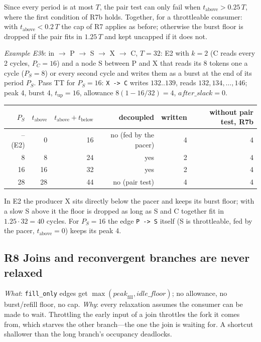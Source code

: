 \documentclass[10pt,a4paper]{article}
\newcommand{\code}[1]{\texttt{#1}}
\newcommand{\Tg}{T}           %
\begin{document}
Since every period is at most $\Tg$, the pair test can only fail when
$t_{\mathrm{above}}>0.25\,\Tg$, where the first condition of R7b holds. Together, for
a throttleable consumer: with $t_{\mathrm{above}}<0.2\,\Tg$ the cap of R7 applies as
before; otherwise the burst floor is dropped if the pair fits in $1.25\,\Tg$ and kept
uncapped if it does not.

\emph{Example E3b}: in $\to$ P $\to$ S $\to$ X $\to$ C, $\Tg=32$: E2 with $k=2$
(C reads every 2 cycles, $P_C=16$) and a node S between P and X that reads its 8 tokens
one a cycle ($P_S=8$) or every second cycle and writes them as a burst at the end of its
period $P_S$.
Pass TT for $P_S=16$: \code{X -> C} writes $132..139$, reads $132,134,\dots,146$; peak 4,
burst 4, $t_{\mathrm{up}}=16$, allowance $8(1-16/32)=4$, $\mathit{after\_slack}=0$.
\begin{center}\small
\begin{tabular}{@{}rrrrrr@{}}
\toprule
$P_S$ & $t_{\mathrm{above}}$ & $t_{\mathrm{above}}+t_{\mathrm{below}}$ & decoupled & written & without pair test, R7b\\
\midrule
-- (E2) & 0  & 16 & no (fed by the pacer) & 4 & 4\\
8       & 8  & 24 & yes & 2 & 4\\
16      & 16 & 32 & yes & 2 & 4\\
28      & 28 & 44 & no (pair test) & 4 & 4\\
\bottomrule
\end{tabular}
\end{center}
In E2 the producer X sits directly below the pacer and keeps its burst floor; with a
slow S above it the floor is dropped as long as S and C together fit in
$1.25\cdot32=40$ cycles. For $P_S=16$ the edge \code{P -> S} itself (S is
throttleable, fed by the pacer, $t_{\mathrm{above}}=0$) keeps its peak 4.

\subsection{R8 Joins and reconvergent branches are never relaxed}\label{sec:join}

\emph{What}: \code{fill\_only} edges get $\max(\mathit{peak}_{\mathrm{fill}},\mathit{idle\_floor})$; no
allowance, no burst/refill floor, no cap. \emph{Why}: every relaxation assumes the
consumer can be made to wait. Throttling the early input of a join throttles the
fork it comes from, which starves the other branch---the one the join is waiting
for. A shortcut shallower than the long branch's occupancy deadlocks.
\end{document}
